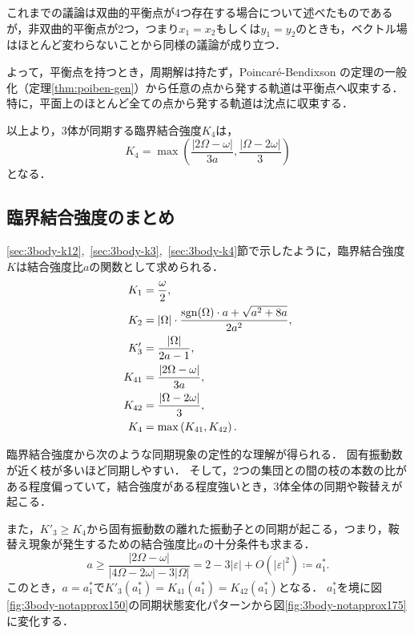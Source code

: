 \documentclass[../main]{subfiles}
\begin{document}
    これまでの議論は双曲的平衡点が4つ存在する場合について述べたものであるが，非双曲的平衡点が2つ，つまり$x_1=x_2$もしくは$y_1=y_2$のときも，ベクトル場はほとんど変わらないことから同様の議論が成り立つ．

    よって，平衡点を持つとき，周期解は持たず，Poincar\'{e}-Bendixson の定理の一般化（定理\ref{thm:poiben-gen}）から任意の点から発する軌道は平衡点へ収束する．
    特に，平面上のほとんど全ての点から発する軌道は沈点に収束する．

    以上より，3体が同期する臨界結合強度$K_4$は，
    \begin{equation}
        \label{eq:K4-approx}
        K_4=\max\left(\frac{|2\Omega-\omega|}{3a},\frac{|\Omega-2\omega|}{3}\right)
    \end{equation}
    となる．
    
    \subsection{臨界結合強度のまとめ}
    \label{sec:3body-summary}
    \ref{sec:3body-k12},\ \ref{sec:3body-k3},\ \ref{sec:3body-k4}節で示したように，臨界結合強度$K$は結合強度比$a$の関数として求められる．
    \begin{align}
        \label{eq:3body-matome}
        \begin{split}
            K_1&=\frac{\omega}{2},\\
            K_2&=|\Omega|\cdot\frac{\operatorname{sgn}(\Omega) \cdot a+\sqrt{a^2+8a}}{2a^2},\\
            K'_3&=\frac{|\Omega|}{2a-1},\\
            K_{41}&=\frac{|2\Omega-\omega|}{3a},\\
            K_{42}&=\frac{|\Omega-2\omega|}{3},\\
            K_4&=\max\left(K_{41},K_{42}\right).
        \end{split}
    \end{align}

    臨界結合強度から次のような同期現象の定性的な理解が得られる．
    固有振動数が近く枝が多いほど同期しやすい．
    そして，2つの集団との間の枝の本数の比がある程度偏っていて，結合強度がある程度強いとき，3体全体の同期や鞍替えが起こる．
    
    また，$K'_3\geq K_4$から固有振動数の離れた振動子との同期が起こる，つまり，鞍替え現象が発生するための結合強度比$a$の十分条件も求まる．
    \begin{equation}
        \label{eq:a-ast1}
        a\geq \frac{|2\Omega-\omega|}{|4\Omega-2\omega|-3|\Omega|}= 2-3|\varepsilon|+O(|\varepsilon|^2)\coloneqq a^\ast_1.    
    \end{equation}
    このとき，$a=a^\ast_1$で$K'_{3}(a^\ast_1)=K_{41}(a^\ast_1)=K_{42}(a^\ast_1)$となる．
    $a^\ast_1$を境に図\ref{fig:3body-notapprox150}の同期状態変化パターンから図\ref{fig:3body-notapprox175}に変化する．
\end{document}
